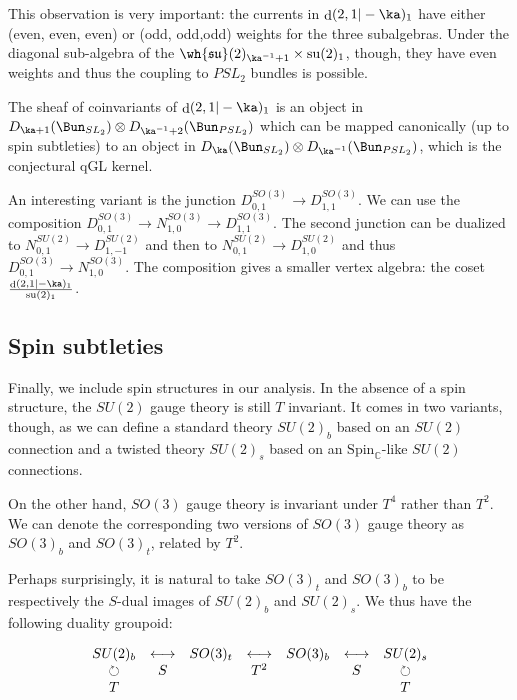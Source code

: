 \documentclass[11pt,reqno]{amsart}
\theoremstyle{plain}
\numberwithin{equation}{section}
\newcommand{\C}{\mathbb{C}}
\DeclareMathOperator{\td}{d}
\DeclareMathOperator{\tsu}{su}
\theoremstyle{definition}
\begin{document}
This observation is very important: the currents in $\td(2,1|-\ka)_1$
have either (even, even, even) or (odd, odd,odd) weights for the three
subalgebras. Under the diagonal sub-algebra of the
$\wh{\mathfrak{su}}(2)_{\ka^{-1}+1} \times \tsu(2)_1$, though, they
have even weights and thus the coupling to $PSL_2$ bundles is
possible.

The sheaf of coinvariants of $\td(2,1|-\ka)_1$ is an object in
$D_{\ka+1}(\Bun_{SL_2}) \otimes D_{\ka^{-1}+2}(\Bun_{PSL_2})$ which can be
mapped canonically (up to spin subtleties) to an object in
$D_{\ka}(\Bun_{SL_2}) \otimes D_{\ka^{-1}}(\Bun_{PSL_2})$, which is the
conjectural qGL kernel.

An interesting variant is the junction $D^{SO(3)}_{0,1} \to
D^{SO(3)}_{1,1}$. We can use the composition $D_{0,1}^{SO(3)} \to
N_{1,0}^{SO(3)} \to D_{1,1}^{SO(3)}$. The second junction can be
dualized to $N_{0,1}^{SU(2)} \to D_{1,-1}^{SU(2)}$ and then to
$N_{0,1}^{SU(2)} \to D_{1,0}^{SU(2)}$ and thus $D_{0,1}^{SO(3)} \to
N_{1,0}^{SO(3)}$. The composition gives a smaller vertex algebra: the
coset $\frac{\td(2,1|-\ka)_1}{\tsu(2)_1}$.

\subsection{Spin subtleties}    \label{spin sub}

Finally, we include spin structures in our analysis. In the absence of
a spin structure, the $SU(2)$ gauge theory is still $T$ invariant. It
comes in two variants, though, as we can define a standard theory
$SU(2)_b$ based on an $SU(2)$ connection and a twisted theory
$SU(2)_s$ based on an $\mathrm{Spin}_\C$-like $SU(2)$ connections.

On the other hand, $SO(3)$ gauge theory is invariant under $T^4$
rather than $T^2$. We can denote the corresponding two versions of
$SO(3)$ gauge theory as $SO(3)_b$ and $SO(3)_t$, related by $T^2$.

Perhaps surprisingly, it is natural to take $SO(3)_t$ and $SO(3)_b$
to be respectively the $S$-dual images of $SU(2)_b$ and $SU(2)_s$. 
We thus have the following duality groupoid:
 
\begin{equation}
\begin{matrix} SU(2)_b & \longleftrightarrow & SO(3)_t & \longleftrightarrow &
SO(3)_b & \longleftrightarrow & SU(2)_s \cr \circlearrowright & S &&T^2&&S&\circlearrowright 
\cr T & &&&&& T\end{matrix}
\end{equation}
\end{document}
